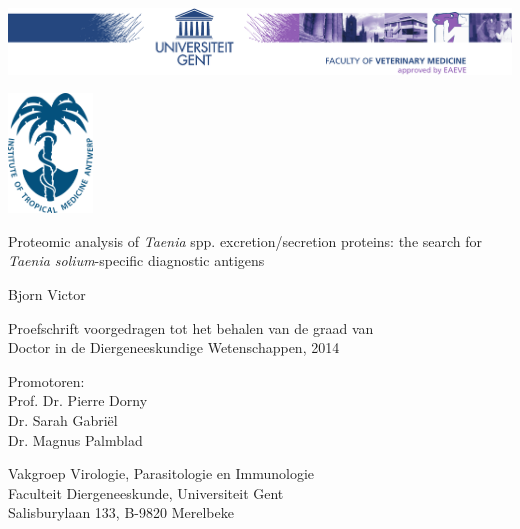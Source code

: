 
\begin{titlepage}
	\centering
	\includegraphics[width=\textwidth]{fig/DI-eps-converted-to.pdf}
	
	\vspace{1cm}
	
	\includegraphics[width=2.25cm]{fig/ITGlogo_new} 
	\vspace{2.25cm}
	
	{\Huge \textsf{Proteomic analysis of \textit{Taenia} spp. excretion/secretion proteins: the search for \textit{Taenia solium}-specific diagnostic antigens}}
	
	\vspace{2.25cm}
	
	{\LARGE \textsf{Bjorn Victor}}
	
	\vspace{2.25cm}
	
	{\textsf{Proefschrift voorgedragen tot het behalen van de graad van \\Doctor in de Diergeneeskundige Wetenschappen, 2014}}
	
	\vfill
	
	{\textsf{Promotoren: \\
			Prof. Dr. Pierre Dorny\\Dr. Sarah Gabri\"el\\ Dr. Magnus Palmblad}}
	
	\vfill
	
	{\textsf{Vakgroep Virologie, Parasitologie en Immunologie\\
			Faculteit Diergeneeskunde, Universiteit Gent \\
			Salisburylaan 133, B-9820 Merelbeke}}
\end{titlepage}


\newpage{\thispagestyle{empty}\cleardoublepage}

